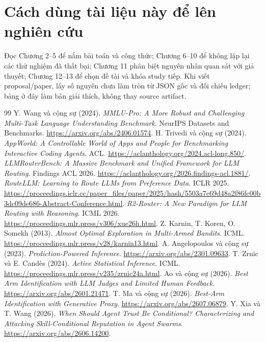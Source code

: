 \documentclass[11pt,a4paper,openany]{book}
\begin{document}
\section{Cách dùng tài liệu này để lên nghiên cứu}
Đọc Chương 2--5 để nắm bài toán và công thức; Chương 6--10 để không lặp lại các thử nghiệm đã thất bại; Chương 11 phân biệt nguyên nhân quan sát với giả thuyết; Chương 12--13 để chọn đề tài và khóa study tiếp. Khi viết proposal/paper, lấy số nguyên chưa làm tròn từ JSON gốc và đối chiếu ledger; bảng ở đây làm bản giải thích, không thay source artifact.

\begin{thebibliography}{99}
 Y. Wang và cộng sự (2024). \emph{MMLU-Pro: A More Robust and Challenging Multi-Task Language Understanding Benchmark}. NeurIPS Datasets and Benchmarks. \url{https://arxiv.org/abs/2406.01574}.
 H. Trivedi và cộng sự (2024). \emph{AppWorld: A Controllable World of Apps and People for Benchmarking Interactive Coding Agents}. ACL. \url{https://aclanthology.org/2024.acl-long.850/}.
 \emph{LLMRouterBench: A Massive Benchmark and Unified Framework for LLM Routing}. Findings ACL 2026. \url{https://aclanthology.org/2026.findings-acl.1881/}.
 \emph{RouteLLM: Learning to Route LLMs from Preference Data}. ICLR 2025. \url{https://proceedings.iclr.cc/paper_files/paper/2025/hash/5503a7c69d48a2f86fc00b3dc09de686-Abstract-Conference.html}.
 \emph{R2-Router: A New Paradigm for LLM Routing with Reasoning}. ICML 2026. \url{https://proceedings.mlr.press/v306/xue26h.html}.
 Z. Karnin, T. Koren, O. Somekh (2013). \emph{Almost Optimal Exploration in Multi-Armed Bandits}. ICML. \url{https://proceedings.mlr.press/v28/karnin13.html}.
 A. Angelopoulos và cộng sự (2023). \emph{Prediction-Powered Inference}. \url{https://arxiv.org/abs/2301.09633}.
 T. Zrnic và E. Candès (2024). \emph{Active Statistical Inference}. ICML. \url{https://proceedings.mlr.press/v235/zrnic24a.html}.
 Ao và cộng sự (2026). \emph{Best Arm Identification with LLM Judges and Limited Human Feedback}. \url{https://arxiv.org/abs/2601.21471}.
 T. Ma và cộng sự (2026). \emph{Best-Arm Identification with Generative Proxy}. \url{https://arxiv.org/abs/2607.06879}.
 Y. Xia và T. Wang (2026). \emph{When Should Agent Trust Be Conditional? Characterizing and Attacking Skill-Conditional Reputation in Agent Swarms}. \url{https://arxiv.org/abs/2606.14200}.
\end{thebibliography}
\end{document}
